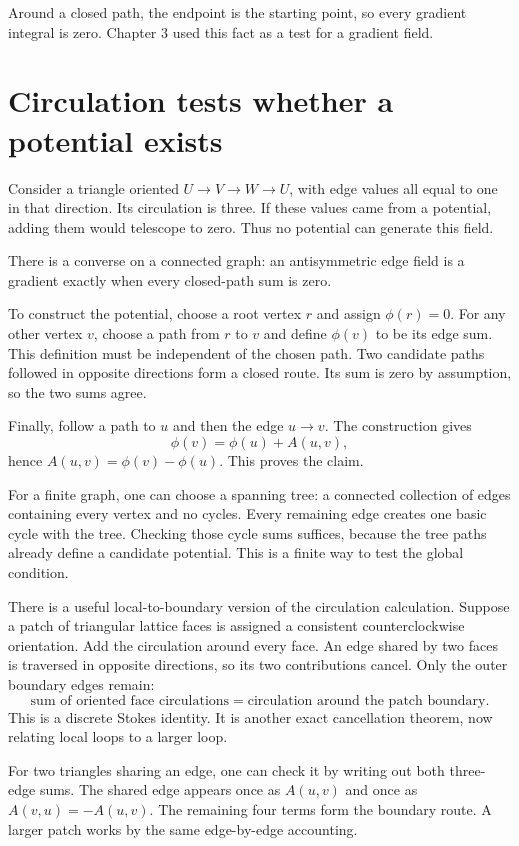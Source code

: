 \documentclass[11pt,oneside,openany]{book}
\theoremstyle{definition}
\theoremstyle{remark}
\numberwithin{equation}{chapter}
\begin{document}
Around a closed path, the endpoint is the starting point, so every gradient integral is zero. Chapter 3 used this fact as a test for a gradient field.

\section{Circulation tests whether a potential exists}\label{ch08-circulation-tests-whether-a-potential-exists}

Consider a triangle oriented \(U\to V\to W\to U\), with edge values all equal to one in that direction. Its circulation is three. If these values came from a potential, adding them would telescope to zero. Thus no potential can generate this field.

There is a converse on a connected graph: an antisymmetric edge field is a gradient exactly when every closed-path sum is zero.

To construct the potential, choose a root vertex \(r\) and assign \(\phi(r)=0\). For any other vertex \(v\), choose a path from \(r\) to \(v\) and define \(\phi(v)\) to be its edge sum. This definition must be independent of the chosen path. Two candidate paths followed in opposite directions form a closed route. Its sum is zero by assumption, so the two sums agree.

Finally, follow a path to \(u\) and then the edge \(u\to v\). The construction gives \[\phi(v)=\phi(u)+A(u,v),\] hence \(A(u,v)=\phi(v)-\phi(u)\). This proves the claim.

For a finite graph, one can choose a spanning tree: a connected collection of edges containing every vertex and no cycles. Every remaining edge creates one basic cycle with the tree. Checking those cycle sums suffices, because the tree paths already define a candidate potential. This is a finite way to test the global condition.

There is a useful local-to-boundary version of the circulation calculation. Suppose a patch of triangular lattice faces is assigned a consistent counterclockwise orientation. Add the circulation around every face. An edge shared by two faces is traversed in opposite directions, so its two contributions cancel. Only the outer boundary edges remain: \[\boxed{\text{sum of oriented face circulations}
=\text{circulation around the patch boundary}.}\] This is a discrete Stokes identity. It is another exact cancellation theorem, now relating local loops to a larger loop.

For two triangles sharing an edge, one can check it by writing out both three-edge sums. The shared edge appears once as \(A(u,v)\) and once as \(A(v,u)=-A(u,v)\). The remaining four terms form the boundary route. A larger patch works by the same edge-by-edge accounting.
\end{document}
